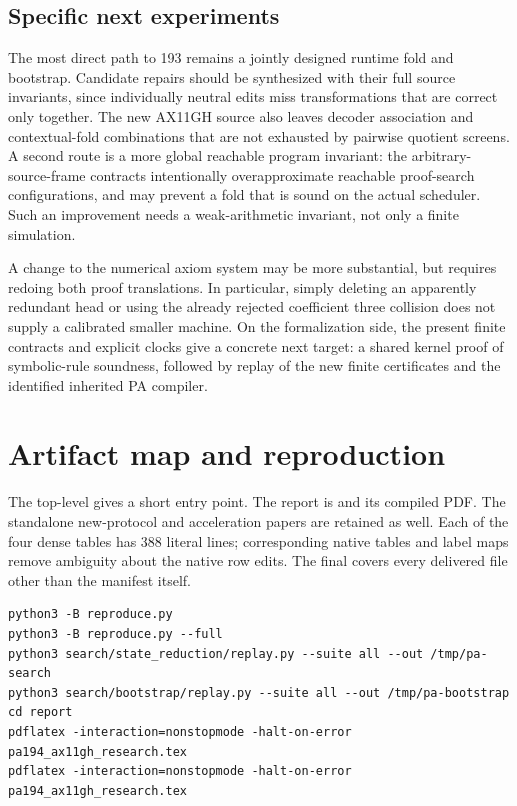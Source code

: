 \subsection{Specific next experiments}

The most direct path to 193 remains a jointly designed runtime fold and
bootstrap. Candidate repairs should be synthesized with their full
source invariants, since individually neutral edits miss transformations
that are correct only together. The new AX11GH source also leaves decoder
association and contextual-fold combinations that are not exhausted by
pairwise quotient screens. A second route is a more global reachable
program invariant: the arbitrary-source-frame contracts intentionally
overapproximate reachable proof-search configurations, and may prevent
a fold that is sound on the actual scheduler. Such an improvement needs
a weak-arithmetic invariant, not only a finite simulation.

A change to the numerical axiom system may be more substantial, but
requires redoing both proof translations. In particular, simply deleting
an apparently redundant head or using the already rejected coefficient
three collision does not supply a calibrated smaller machine. On the
formalization side, the present finite contracts and explicit clocks
give a concrete next target: a shared kernel proof of symbolic-rule
soundness, followed by replay of the new finite certificates and the
identified inherited PA compiler.

\section{Artifact map and reproduction}

The top-level  gives a short entry point. The report is
 and its compiled PDF. The
standalone new-protocol and acceleration papers are retained as well.
Each of the four dense tables has 388 literal lines; corresponding native
tables and label maps remove ambiguity about the native row edits.
The final  covers every delivered file other
than the manifest itself.

\begin{verbatim}
python3 -B reproduce.py
python3 -B reproduce.py --full
python3 search/state_reduction/replay.py --suite all --out /tmp/pa-search
python3 search/bootstrap/replay.py --suite all --out /tmp/pa-bootstrap
cd report
pdflatex -interaction=nonstopmode -halt-on-error pa194_ax11gh_research.tex
pdflatex -interaction=nonstopmode -halt-on-error pa194_ax11gh_research.tex
\end{verbatim}


